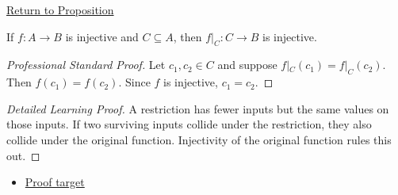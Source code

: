 \newpage
{}
\label{prf:restriction-preserves-injective}

\begin{remark*}[Return]
\hyperref[prop:restriction-preserves-injective]{Return to Proposition}
\end{remark*}

\begin{proposition*}
If $f:A\to B$ is injective and $C\subseteq A$, then $f|_C:C\to B$ is injective.
\end{proposition*}

\begin{proof}[Professional Standard Proof]
\LRAProofBodyStart
Let $c_1,c_2\in C$ and suppose $f|_C(c_1)=f|_C(c_2)$. Then
$f(c_1)=f(c_2)$. Since $f$ is injective, $c_1=c_2$.
\end{proof}

\begin{proof}[Detailed Learning Proof]
\LRAProofBodyStart
A restriction has fewer inputs but the same values on those inputs. If two
surviving inputs collide under the restriction, they also collide under the
original function. Injectivity of the original function rules this out.
\end{proof}
\begin{remark*}
\end{remark*}



\begin{dependencies}
\begin{itemize}
  \item \hyperref[prop:restriction-preserves-injective]{Proof target}
\end{itemize}
\end{dependencies}

\clearpage

